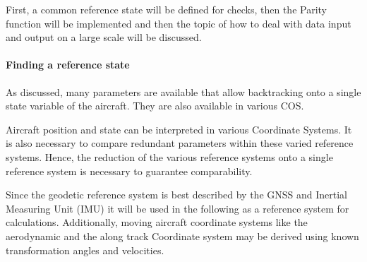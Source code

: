 First, a common reference state will be defined for checks, then the Parity function \cite{chap:parity_equation} will be implemented and then the topic of how to deal with data input and output on a large scale will be discussed.

\paragraph{Finding a reference state}

As discussed, many parameters are available that allow backtracking onto a single state variable of the aircraft. They are also available in various COS.

Aircraft position and state can be interpreted in various Coordinate Systems. It is also necessary to compare redundant parameters within these varied reference systems. Hence, the reduction of the various reference systems onto a single reference system is necessary to guarantee comparability.

Since the geodetic reference system is best described by the GNSS and Inertial Measuring Unit (IMU) it will be used in the following as a reference system for calculations. Additionally, moving aircraft coordinate systems like the aerodynamic and the along track Coordinate system may be derived using known transformation angles and velocities. \cite{brockhaus_flugregelung_2011}





